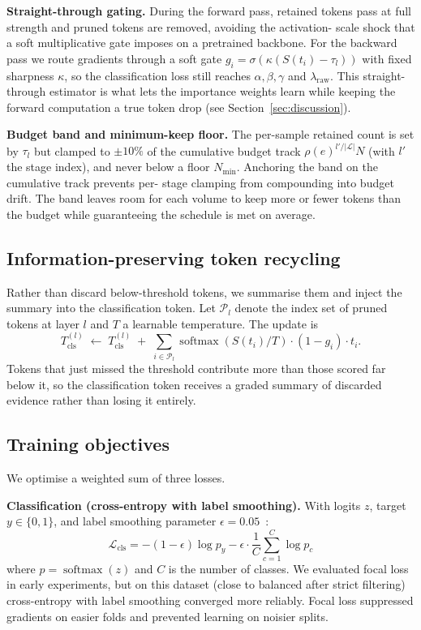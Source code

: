 \documentclass[journal]{IEEEtran}
\DeclareMathOperator*{\softmax}{softmax}
\newcommand{\Lcls}{\mathcal{L}_{\mathrm{cls}}}
\begin{document}
\textbf{Straight-through gating.} During the forward pass, retained tokens
pass at full strength and pruned tokens are removed, avoiding the activation-
scale shock that a soft multiplicative gate imposes on a pretrained backbone.
For the backward pass we route gradients through a soft gate
$g_i = \sigma(\kappa(S(t_i) - \tau_l))$ with fixed sharpness $\kappa$, so the
classification loss still reaches $\alpha, \beta, \gamma$ and
$\lambda_{\text{raw}}$. This straight-through estimator is what lets the
importance weights learn while keeping the forward computation a true token
drop (see Section~\ref{sec:discussion}).

\textbf{Budget band and minimum-keep floor.} The per-sample retained count is
set by $\tau_l$ but clamped to $\pm 10\%$ of the cumulative budget track
$\rho(e)^{l'/|\mathcal{L}|} N$ (with $l'$ the stage index), and never below a
floor $N_{\min}$. Anchoring the band on the cumulative track prevents per-
stage clamping from compounding into budget drift. The band leaves room for
each volume to keep more or fewer tokens than the budget while guaranteeing
the schedule is met on average.

\subsection{Information-preserving token recycling}\label{ssec:recycle}
Rather than discard below-threshold tokens, we summarise them and inject the
summary into the classification token. Let $\mathcal{P}_l$ denote the index
set of pruned tokens at layer $l$ and $T$ a learnable temperature. The update
is
\begin{equation}
    T_{\mathrm{cls}}^{(l)}
    \;\leftarrow\;
    T_{\mathrm{cls}}^{(l)}
    \;+\; \sum_{i \in \mathcal{P}_l} \softmax\!\left( S(t_i) / T \right)
    \cdot (1 - g_i) \cdot t_i.
\end{equation}
Tokens that just missed the threshold contribute more than those scored far
below it, so the classification token receives a graded summary of discarded
evidence rather than losing it entirely.

\subsection{Training objectives}\label{ssec:losses}
We optimise a weighted sum of three losses.

\textbf{Classification (cross-entropy with label smoothing).} With logits
$z$, target $y \in \{0,1\}$, and label smoothing parameter
$\epsilon = 0.05$~\cite{szegedy2016}:
\begin{equation}
    \Lcls = -(1-\epsilon)\log p_y - \epsilon \cdot \frac{1}{C}\sum_{c=1}^{C} \log p_c
\end{equation}
where $p = \softmax(z)$ and $C$ is the number of classes. We evaluated focal
loss~\cite{liao2019} in early experiments, but on this dataset (close to
balanced after strict filtering) cross-entropy with label smoothing converged
more reliably. Focal loss suppressed gradients on easier folds and prevented
learning on noisier splits.
\end{document}
